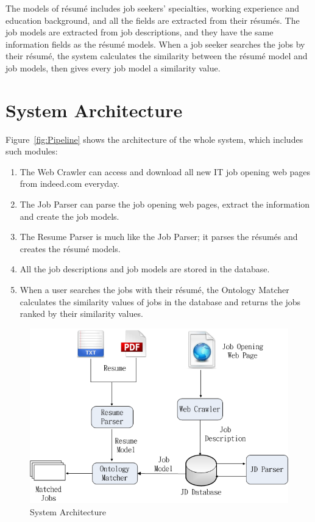 The models of r\'esum\'e includes job seekers' specialties, working experience and education background, and all the fields are extracted from their r\'esum\'es. The job models are extracted from job descriptions, and they have the same information fields as the r\'esum\'e models.  When a job seeker searches the jobs by their r\'esum\'e, the system calculates the similarity between the r\'esum\'e model and job models, then gives every job model a similarity value.

\section{System Architecture}

Figure~\ref{fig:Pipeline} shows the architecture of the whole system, which includes such modules:

\begin{enumerate}
    \item The Web Crawler can access and download all new IT job opening web pages from indeed.com everyday.
    \item The Job Parser can parse the job opening web pages, extract the information and create the job models.
    \item The Resume Parser is much like the Job Parser; it parses the r\'esum\'es and creates the r\'esum\'e models.
    \item All the job descriptions and job models are stored in the database.
    \item When a user searches  the jobs with their r\'esum\'e, the Ontology Matcher calculates the similarity values of jobs in the database and returns the jobs ranked by their similarity values.
\end{enumerate}

\begin{figure}[htbp]
  \centering
  \includegraphics[scale=0.5]{images/arch.png}
  \caption{System Architecture}
  \label{fig:arch}
\end{figure}

